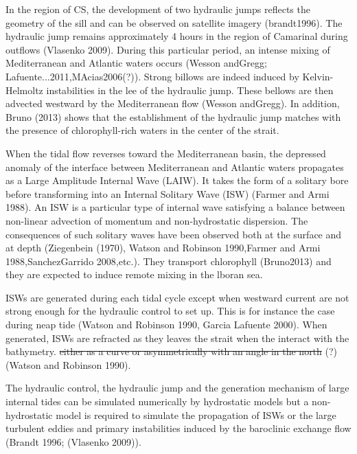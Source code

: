 \color{blue}In the region of CS, the \color{blue} development of two hydraulic jumps reflects the geometry of the sill and can be observed on satellite imagery (brandt1996). The hydraulic jump remains approximately 4 hours in the region of Camarinal during outflows (Vlasenko 2009). \color{blue} During this particular period, an intense mixing of Mediterranean and Atlantic waters occurs (Wesson andGregg; Lafuente...2011,MAcias2006(?)). \color{blue} Strong billows are indeed induced by \color{blue} Kelvin-Helmoltz instabilities in the lee of the hydraulic jump. These bellows are then advected westward by the Mediterranean flow (Wesson andGregg). In addition, Bruno (2013) shows that the establishment of the hydraulic jump matches with the presence of chlorophyll-rich waters in the center of the strait. \color{black}

\color{blue}When the tidal flow reverses toward the Mediterranean basin, the depressed anomaly of the interface between Mediterranean and Atlantic waters propagates as a Large Amplitude Internal Wave (LAIW). It takes the form of a solitary bore before transforming into an Internal Solitary Wave (ISW) (Farmer and Armi 1988). An ISW is a particular type of internal wave satisfying a balance between non-linear advection of momentum and non-hydrostatic dispersion. The consequences of such solitary waves \color{black} have been observed both at the surface and at depth (Ziegenbein (1970), Watson and Robinson 1990,Farmer and Armi 1988,SanchezGarrido 2008,etc.). They transport chlorophyll (Bruno2013) and \color{blue} they are expected to induce \color{black} remote mixing in the lboran sea.

ISWs are generated during each tidal cycle except when westward current are not strong enough  \color{blue}for the hydraulic control to set up. This is for instance the case during neap tide (Watson and Robinson 1990, Garcia Lafuente 2000). When generated, ISWs are refracted as they leaves the strait when the interact with the bathymetry. \sout{either as a curve or asymmetrically with an angle in the north} (?) \color{black} (Watson and Robinson 1990).

\color{blue}The hydraulic control, the hydraulic jump and the generation mechanism of large internal tides can be simulated numerically by hydrostatic models but a non-hydrostatic model is required to simulate the propagation of ISWs or the large turbulent eddies and primary instabilities induced by the baroclinic exchange flow (Brandt 1996; (Vlasenko 2009)). \color{black}



